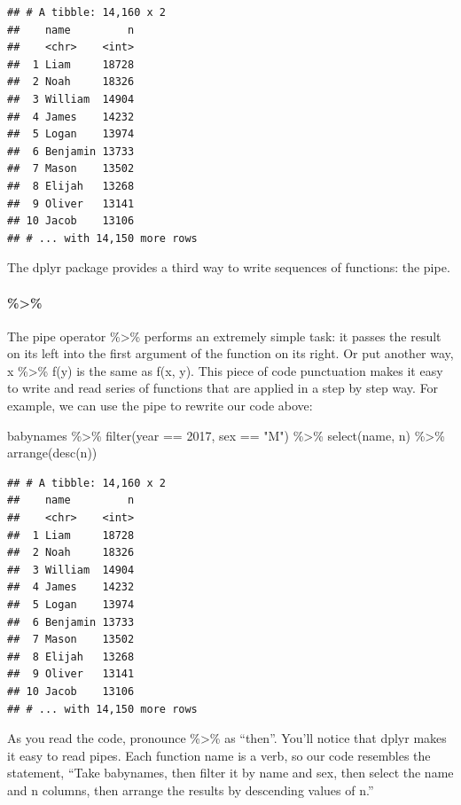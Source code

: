 \documentclass[
]{article}
\newenvironment{Shaded}{\begin{snugshade}}{\end{snugshade}}
\newcommand{\DecValTok}[1]{\textcolor[rgb]{0.00,0.00,0.81}{#1}}
\newcommand{\FunctionTok}[1]{\textcolor[rgb]{0.00,0.00,0.00}{#1}}
\newcommand{\NormalTok}[1]{#1}
\newcommand{\SpecialCharTok}[1]{\textcolor[rgb]{0.00,0.00,0.00}{#1}}
\newcommand{\StringTok}[1]{\textcolor[rgb]{0.31,0.60,0.02}{#1}}
\begin{document}
\begin{verbatim}
## # A tibble: 14,160 x 2
##    name         n
##    <chr>    <int>
##  1 Liam     18728
##  2 Noah     18326
##  3 William  14904
##  4 James    14232
##  5 Logan    13974
##  6 Benjamin 13733
##  7 Mason    13502
##  8 Elijah   13268
##  9 Oliver   13141
## 10 Jacob    13106
## # ... with 14,150 more rows
\end{verbatim}

The dplyr package provides a third way to write sequences of functions:
the pipe.

\hypertarget{section-1}{%
\paragraph{\%\textgreater\%}\label{section-1}}

The pipe operator \%\textgreater\% performs an extremely simple task: it
passes the result on its left into the first argument of the function on
its right. Or put another way, x \%\textgreater\% f(y) is the same as
f(x, y). This piece of code punctuation makes it easy to write and read
series of functions that are applied in a step by step way. For example,
we can use the pipe to rewrite our code above:

\begin{Shaded}
\begin{Highlighting}[]
\NormalTok{babynames }\SpecialCharTok{\%\textgreater{}\%} 
  \FunctionTok{filter}\NormalTok{(year }\SpecialCharTok{==} \DecValTok{2017}\NormalTok{, sex }\SpecialCharTok{==} \StringTok{"M"}\NormalTok{) }\SpecialCharTok{\%\textgreater{}\%} 
  \FunctionTok{select}\NormalTok{(name, n) }\SpecialCharTok{\%\textgreater{}\%} 
  \FunctionTok{arrange}\NormalTok{(}\FunctionTok{desc}\NormalTok{(n))}
\end{Highlighting}
\end{Shaded}

\begin{verbatim}
## # A tibble: 14,160 x 2
##    name         n
##    <chr>    <int>
##  1 Liam     18728
##  2 Noah     18326
##  3 William  14904
##  4 James    14232
##  5 Logan    13974
##  6 Benjamin 13733
##  7 Mason    13502
##  8 Elijah   13268
##  9 Oliver   13141
## 10 Jacob    13106
## # ... with 14,150 more rows
\end{verbatim}

As you read the code, pronounce \%\textgreater\% as ``then''. You'll
notice that dplyr makes it easy to read pipes. Each function name is a
verb, so our code resembles the statement, ``Take babynames, then filter
it by name and sex, then select the name and n columns, then arrange the
results by descending values of n.''
\end{document}
